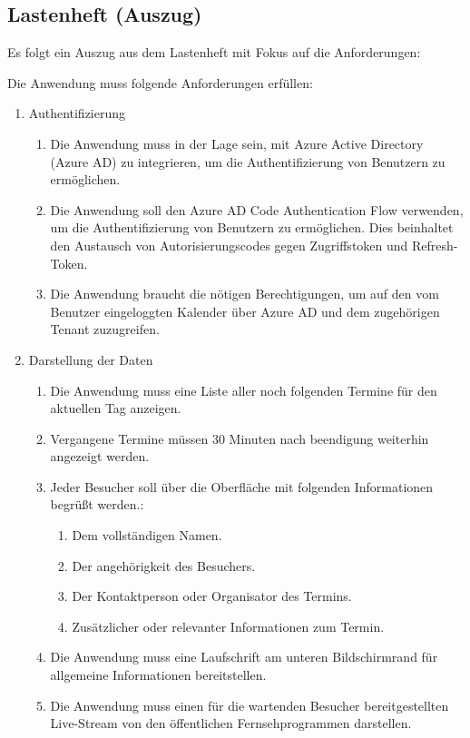\subsection{Lastenheft (Auszug)}
\label{app:Lastenheft}
Es folgt ein Auszug aus dem Lastenheft mit Fokus auf die Anforderungen:

Die Anwendung muss folgende Anforderungen erfüllen: 
\begin{enumerate}[itemsep=0em,partopsep=0em,parsep=0em,topsep=0em]
\item Authentifizierung
	\begin{enumerate}
	\item Die Anwendung muss in der Lage sein, mit Azure Active Directory (Azure AD) zu integrieren, um die Authentifizierung von Benutzern zu ermöglichen.
	\item Die Anwendung soll den Azure AD Code Authentication Flow verwenden, um die Authentifizierung von Benutzern zu ermöglichen. Dies beinhaltet den Austausch von Autorisierungscodes gegen Zugriffstoken und Refresh-Token.
	\item Die Anwendung braucht die nötigen Berechtigungen, um auf den vom Benutzer eingeloggten Kalender über Azure AD und dem zugehörigen Tenant zuzugreifen.
	\end{enumerate}
\item Darstellung der Daten
	\begin{enumerate}
	\item Die Anwendung muss eine Liste aller noch folgenden Termine für den aktuellen Tag anzeigen.
	\item Vergangene Termine müssen 30 Minuten nach beendigung weiterhin angezeigt werden.
	\item Jeder Besucher soll über die Oberfläche mit folgenden Informationen begrüßt werden.:
	\begin{enumerate}
		\item Dem vollständigen Namen.
		\item Der angehörigkeit des Besuchers.
		\item Der Kontaktperson oder Organisator des Termins.
		\item \Ggfs Zusätzlicher oder relevanter Informationen zum Termin.
	\end{enumerate}
	\item Die Anwendung muss eine Laufschrift am unteren Bildschirmrand für allgemeine Informationen bereitstellen.
	\item Die Anwendung muss einen für die wartenden Besucher bereitgestellten Live-Stream von \zB den öffentlichen Fernsehprogrammen darstellen.

\end{enumerate}
\end{enumerate}

